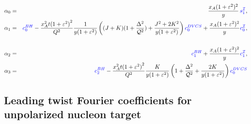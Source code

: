  \begin{eqnarray}
\alpha_{0}& =& \frac{x_A(1+\epsilon^2)^2}{y} \, {\color{blue} s_1^{\cal I}},
\nonumber\\
\alpha_{1}& =& {\color{blue} c_0^{BH}} - \frac{x_A^2 t {(1+\epsilon^2)}^2}{Q^2}  \frac{1}{y (1 + \epsilon^2)}
\left( (J+K) (1 + \frac{\Delta^2}{\cQ^2}) + \frac{J^2 + 2K^2}{y (1 + \epsilon^2)} \right) {\color{blue} c_0^{DVCS}} + \frac{x_A (1+\epsilon^2)^2}{y} {\color{blue} c_0^{\cal I}},\\
\nonumber\\
\alpha_{2}& =& {\color{blue} c_1^{BH}} + \frac{x_A (1+\epsilon^2)^2}{y} {\color{blue} c_1^{\cal I}},
\nonumber\\
\alpha_{3}& =& {\color{blue} c_2^{BH}} - \frac{x_A^2 t {(1+\epsilon^2)}^2}{Q^2}  \frac{K}{y (1 + \epsilon^2)}
\left( 1 + \frac{\Delta^2}{\cQ^2} + \frac{2K}{y (1 + \epsilon^2)} \right) {\color{blue} c_0^{DVCS} }
\nonumber\\
 \label{eq:alphas_}
\end{eqnarray}


\subsection{Leading twist Fourier coefficients for unpolarized nucleon target}

